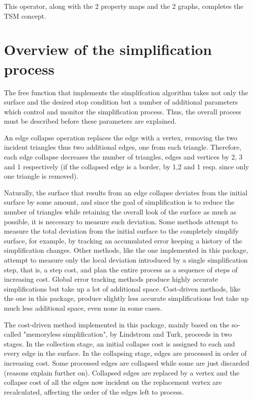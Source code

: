This operator, along with the 2 property maps and the 2 graphs, completes the TSM concept.

\section{Overview of the simplification process}

The free function that implements the simplifcation algorithm takes not only the surface and the desired stop condition but a number of additional parameters which control and monitor the simplification process. Thus, the overall process must be described before these parameters are explained.

An edge collapse operation replaces the edge with a vertex, removing the two incident triangles thus two additional edges, one from each triangle. Therefore, each edge collapse decreases the number of triangles, edges and vertices by 2, 3 and 1 respectively (if the collapsed edge is a border, by 1,2 and 1 resp. since only one triangle is removed).

Naturally, the surface that results from an edge collapse deviates from the initial surface by some amount, and since the goal of simplification is to reduce the number of triangles while retaining the overall look of the surface as much as possible, it is neccesary to measure such deviation. Some methods attempt to measure the total deviation from the initial surface to the completely simplify surface, for example, by tracking an accumulated error keeping a history of the simplification changes. Other methods, like the one implemented in this package, attempt to measure only the local deviation introduced by a single simplification step, that is, a step cost, and plan the entire process as a sequence of steps of increasing cost. 
Global error tracking methods produce highly accurate simplifications but take up a lot of additional space. Cost-driven methods, like the one in this package, produce slightly less accurate simplifications but take up much less additional space, even none in some cases.

The cost-driven method implemented in this package, mainly based on the so-called "memoryless simplification", by Lindstrom and Turk, proceeds in two stages. In the collection stage, an initial collapse cost is assigned to each and every edge in the surface. In the collapsing stage, edges are processed in order of increasing cost. Some processed edges are collapsed while some are just discarded (reasons explain further on). Collapsed edges are replaced by a vertex and the collapse cost of all the edges now incident on the replacement vertex are recalculated, affecting the order of the edges left to process.

